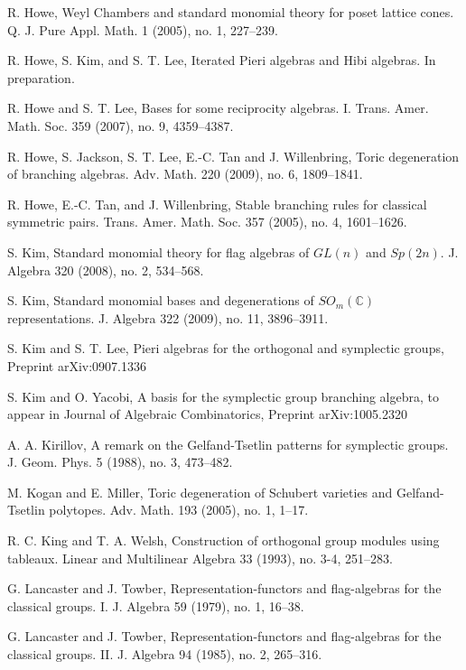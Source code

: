 \documentclass[11pt]{amsart}
\numberwithin{equation}{subsection}
\begin{document}
\begin{thebibliography}{DEP82}
 R. Howe, Weyl Chambers and standard monomial theory
for poset lattice cones. Q. J. Pure Appl. Math. 1 (2005), no. 1, 227--239.

 R. Howe, S. Kim, and S. T. Lee, Iterated Pieri algebras and 
Hibi algebras. In preparation.

 R. Howe and S. T. Lee, Bases for some reciprocity
algebras. I. Trans. Amer. Math. Soc. 359 (2007), no. 9, 4359--4387.

 R. Howe, S. Jackson, S. T. Lee, E.-C. Tan and J.
Willenbring, Toric degeneration of branching algebras. Adv. Math. 220
(2009), no. 6, 1809--1841.

 R. Howe, E.-C. Tan, and J. Willenbring, Stable branching
rules for classical symmetric pairs. Trans. Amer. Math. Soc. 357 (2005), no.
4, 1601--1626.

 S. Kim, Standard monomial theory for flag algebras of 
$GL(n)$ and $Sp(2n)$. J. Algebra 320 (2008), no. 2, 534--568.

 S. Kim, Standard monomial bases and degenerations of 
$SO_{m}(\mathbb{C})$ representations. J. Algebra 322 (2009), no. 11, 3896--3911.

 S. Kim and S. T. Lee, Pieri algebras for the orthogonal and
symplectic groups, Preprint arXiv:0907.1336

 S. Kim and O. Yacobi, A basis for the symplectic group 
branching algebra, to appear in Journal of Algebraic Combinatorics,
Preprint arXiv:1005.2320

 A. A. Kirillov, A remark on the Gelfand-Tsetlin patterns for 
symplectic groups. J. Geom. Phys. 5 (1988), no. 3, 473--482.

 M. Kogan and E. Miller, Toric degeneration of Schubert
varieties and Gelfand-Tsetlin polytopes. Adv. Math. 193 (2005), no. 1, 1--17.

 R. C. King and T. A. Welsh, Construction of orthogonal
group modules using tableaux. Linear and Multilinear Algebra 33 (1993), no.
3-4, 251--283.


 G. Lancaster and J. Towber, Representation-functors and
flag-algebras for the classical groups. I. J. Algebra 59 (1979), no. 1,
16--38.

 G. Lancaster and J. Towber, Representation-functors and
flag-algebras for the classical groups. II. J. Algebra 94 (1985), no. 2,
265--316.


\end{thebibliography}
\end{document}
